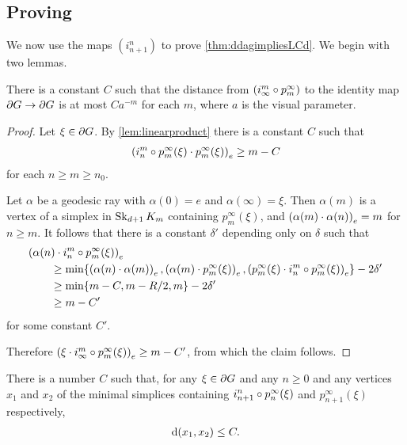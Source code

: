 \documentclass[a4paper]{article}
\begin{document}
\subsection{Proving }

We now use the maps $(i^n_{n+1})$ to prove \cref{thm:ddagimpliesLCd}. We begin
with two lemmas.

\begin{lemma}\label{lem:convergestoidentity}
  There is a constant $C$ such that the distance from $(i^m_\infty \composed 
  p^\infty_m)$ to the identity map $\boundary G\to\boundary G$ is at most 
  $Ca^{-m}$ for each $m$, where $a$ is the visual parameter.
\end{lemma}

\begin{proof}
  Let $\xi \in \boundary G$. By \cref{lem:linearproduct} there is a 
  constant $C$ such that 
  \begin{align*}
    \gromov{e}{i^m_n\composed p^\infty_m(\xi)}{p^\infty_m(\xi)} \geq m - C
  \end{align*} 
  for each $n\geq m\geq n_0$. 

  Let $\alpha$ be a geodesic ray with $\alpha(0) = e$ and $\alpha(\infty) = 
  \xi$. Then $\alpha(m)$ is a vertex of a simplex in $\Skel_{d+1}K_m$ containing 
  $p^\infty_m(\xi)$, and $\gromov{e}{\alpha(m)}{\alpha(n)} = m$ for $n\geq m$.
  It follows that there is a constant $\delta'$ depending only on $\delta$ such 
  that
  \begin{align*}
    \mathrlap{\gromov{e}{\alpha(n)}{i^m_n\composed p^\infty_m(\xi)}}\quad\quad &\\
          & \geq \min\{\gromov{e}{\alpha(n)}{\alpha(m)}, 
            \gromov{e}{\alpha(m)}{p^\infty_m(\xi)}, 
            \gromov{e}{p^\infty_m(\xi)}{i^m_n\composed p^\infty_m(\xi)}\} 
            - 2\delta' \\
          &\geq \min\{m - C, m - R/2, m\} - 2\delta' \\
          &\geq m - C'
  \end{align*}
  for some constant $C'$.

  Therefore $\gromov{e}{\xi}{i^m_\infty\composed p^\infty_m(\xi)} \geq m - C'$, 
  from which the claim follows.
\end{proof}

\begin{lemma}\label{lem:name_this}
  There is a number $C$ such that, for any $\xi \in \boundary G$ and any $n
  \geq 0$ and any vertices $x_1$ and $x_2$ of the minimal simplices containing
  $i^n_{n+1}\composed p^\infty_n(\xi)$ and $p^\infty_{n+1}(\xi)$ respectively,
  \begin{align*}
    \dist(x_1, x_2) \leq C.
  \end{align*}
\end{lemma}
\end{document}

